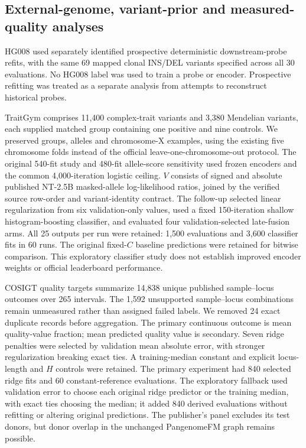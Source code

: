 \subsection{External-genome, variant-prior and measured-quality analyses}

HG008 used separately identified prospective deterministic downstream-probe refits, with the same 69 mapped clonal INS/DEL variants specified across all 30 evaluations. No HG008 label was used to train a probe or encoder. Prospective refitting was treated as a separate analysis from attempts to reconstruct historical probes.

TraitGym comprises 11,400 complex-trait variants and 3,380 Mendelian variants, each supplied matched group containing one positive and nine controls. We preserved groups, alleles and chromosome-X examples, using the existing five chromosome folds instead of the official leave-one-chromosome-out protocol. The original 540-fit study and 480-fit allele-score sensitivity used frozen encoders and the common 4,000-iteration logistic ceiling. $V$ consists of signed and absolute published NT-2.5B masked-allele log-likelihood ratios, joined by the verified source row-order and variant-identity contract. The follow-up selected linear regularization from six validation-only values, used a fixed 150-iteration shallow histogram-boosting classifier, and evaluated four validation-selected late-fusion arms. All 25 outputs per run were retained: 1,500 evaluations and 3,600 classifier fits in 60 runs. The original fixed-$C$ baseline predictions were retained for bitwise comparison. This exploratory classifier study does not establish improved encoder weights or official leaderboard performance.

COSIGT quality targets summarize 14,838 unique published sample--locus outcomes over 265 intervals. The 1,592 unsupported sample--locus combinations remain unmeasured rather than assigned failed labels. We removed 24 exact duplicate records before aggregation. The primary continuous outcome is mean quality-value fraction; mean predicted quality value is secondary. Seven ridge penalties were selected by validation mean absolute error, with stronger regularization breaking exact ties. A training-median constant and explicit locus-length and $H$ controls were retained. The primary experiment had 840 selected ridge fits and 60 constant-reference evaluations. The exploratory fallback used validation error to choose each original ridge predictor or the training median, with exact ties choosing the median; it added 840 derived evaluations without refitting or altering original predictions. The publisher's panel excludes its test donors, but donor overlap in the unchanged PangenomeFM graph remains possible.

